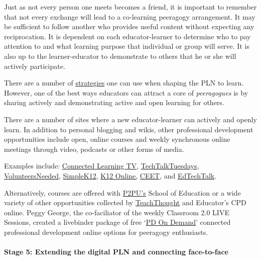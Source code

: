 Just as not every person one meets becomes a friend, it is important to
remember that not every exchange will lead to a co-learning peeragogy
arrangement. It may be sufficient to follow another who provides useful
content without expecting any reciprocation. It is dependent on each
educator-learner to determine who to pay attention to and what learning
purpose that individual or group will serve. It is also up to the
learner-educator to demonstrate to others that he or she will actively
participate.

There are a number of
\href{http://storify.com/digiphile/how-to-build-a-personal-learning-network-on-twitte}{strategies}
one can use when shaping the PLN to learn. However, one of the best ways
educators can attract a core of \emph{peeragogues} is by sharing
actively and demonstrating active and open learning for others.

There are a number of sites where a new educator-learner can actively
and openly learn. In addition to personal blogging and wikis, other
professional development opportunities include open, online courses and
weekly synchronous online meetings through video, podcasts or other
forms of media.

Examples include:
\href{http://connectedlearning.tv/howard-rheingold-social-media-and-peer-learning-mediated-pedagogy-peeragogy}{Connected
Learning TV},
\href{http://techtalktuesdays.global2.vic.edu.au/}{TechTalkTuesdays},
\href{http://learning2gether.pbworks.com/w/page/32206114/volunteersneeded}{VolunteersNeeded},
\href{http://simplek12.com/webinars}{SimpleK12},
\href{http://k12onlineconference.org/}{K12 Online,}
\href{http://www.learnnowbc.ca/educators/moodlemeets/default.aspx}{CEET},
and \href{http://edtechtalk.com/taxonomy/term/130}{EdTechTalk}.

Alternatively, courses are offered with
\href{https://p2pu.org/en/schools/school-of-ed-pilot/}{P2PU's} School of
Education or a wide variety of other opportunities collected by
\href{http://www.teachthought.com/}{TeachThought} and Educator's CPD
online. Peggy George, the co-faciliator of the weekly Classroom 2.0 LIVE
Sessions, created a livebinder package of free
`\href{http://www.livebinders.com/play/play_or_edit?id=429095}{PD
On Demand}' connected professional development online options for
peeragogy enthusiasts.

\paragraph{Stage 5: Extending the digital PLN and connecting
face-to-face}

